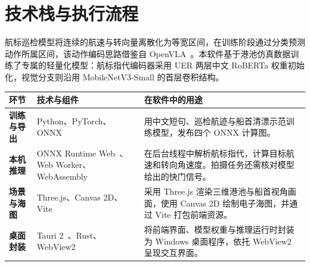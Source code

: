 \documentclass[a4paper,fontset=fandol,zihao=5]{ctexart}
\newcommand{\pagetitle}[1]{\section{#1}}
\begin{document}
\newpage
\pagetitle{技术栈与执行流程}
航标巡检模型将连续的航速与转向量离散化为等宽区间，在训练阶段通过分类预测动作所属区间，该动作编码思路借鉴自 OpenVLA~\cite{kim2025openvla}。本软件基于港池仿真数据训练了专属的轻量化模型：航标指代编码器采用 UER 两层中文 RoBERTa 权重初始化，视觉分支则沿用 MobileNetV3-Small 的首层卷积结构。

\begin{tabularx}{\linewidth}{@{}>{\bfseries}p{22mm}p{48mm}Y@{}}
\toprule
环节 & 技术与组件 & 在软件中的用途\\
\midrule
训练与导出 & Python、PyTorch、ONNX & 用中文短句、巡检航迹与船首清漂示范训练模型，发布四个 ONNX 计算图。\\
本机推理 & ONNX Runtime Web~\cite{ortweb}、Web Worker、WebAssembly & 在后台线程中解析航标指代，计算目标航速和转向角速度。拍摄任务还需核对模型给出的快门信号。\\
场景与海图 & Three.js、Canvas 2D、Vite & 采用 Three.js 渲染三维港池与船首视角画面，使用 Canvas 2D 绘制电子海图，并通过 Vite 打包前端资源。\\
桌面封装 & Tauri 2~\cite{tauri2arch}、Rust、WebView2 & 将前端界面、模型权重与推理运行时封装为 Windows 桌面程序，依托 WebView2 呈现交互界面。\\
\bottomrule
\end{tabularx}
\end{document}
